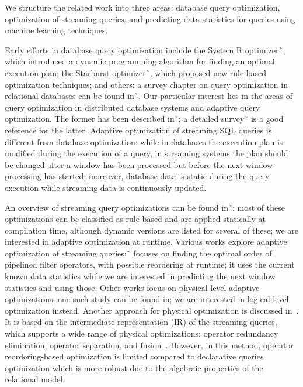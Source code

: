 \label {sec:fs-optimization-related-work}

We structure the related work into three areas: database query optimization, optimization of streaming queries, and predicting data statistics for queries using machine learning techniques.

Early efforts in database query optimization include the System R optimizer˜\cite{selinger1979access}, which introduced a dynamic programming algorithm for finding an optimal execution plan; the Starburst optimizer˜\cite{haas1989extensible}, which proposed new rule-based optimization techniques; and others: a survey chapter on query optimization in relational databases can be found in˜\cite{Neumann2018optimization}. Our particular interest lies in the areas of query optimization in distributed database systems and adaptive query optimization. The former has been described in˜\cite{kossmann2000thestate}; a detailed survey˜\cite{deshpande2007adaptive} is a good reference for the latter. Adaptive optimization of streaming SQL queries is different from database optimization: while in databases the execution plan is modified during the execution of a query, in streaming systems the plan should be changed after a window has been processed but before the next window processing has started; moreover, database data is static during the query execution while streaming data is continuously updated.

An overview of streaming query optimizations can be found in˜\cite{hirzel2014catalog}: most of these optimizations can be classified as rule-based and are applied statically at compilation time, although dynamic versions are listed for several of these; we are interested in adaptive optimization at runtime. Various works explore adaptive optimization of streaming queries:˜\cite{babu2004adaptive} focuses on finding the optimal order of pipelined filter operators, with possible reordering at runtime; it uses the current known data statistics while we are interested in predicting the next window statistics and using those. Other works focus on physical level adaptive optimizations: one such study can be found in\cite{grulich2020grizzly}; we are interested in logical level optimization instead. Another approach for physical optimization is discussed in~\cite{kroll2019arc}. It is based on the intermediate representation (IR) of the streaming queries, which supports a wide range of physical optimizations: operator redundancy elimination, operator separation, and fusion~\cite{hirzel2014catalog}. However, in this method, operator reordering-based optimization is limited compared to declarative queries optimization which is more robust due to the algebraic properties of the relational model. 

